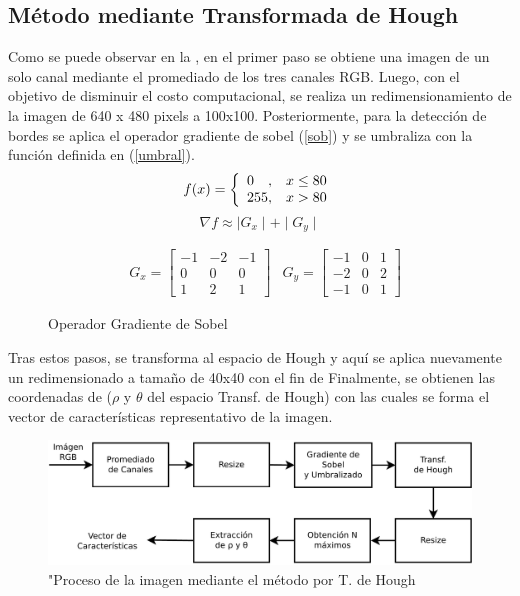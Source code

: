 \documentclass[conference,spanish,a4paper,10pt,oneside,final]{tfmpd}
\begin{document}
\subsection*{Método mediante Transformada de Hough}
Como se puede observar en la , en el primer paso se obtiene una imagen de un solo canal mediante el promediado de los tres canales RGB. Luego, con el objetivo de disminuir el costo computacional, se realiza un redimensionamiento de la imagen de 640 x 480 pixels a 100x100. Posteriormente, para la detección de bordes se aplica el operador gradiente de sobel (\ref{sob}) y se umbraliza con la función definida en (\ref{umbral}).
\begin{equation}\label{umbral}
f(x) = \left\{
\begin{array}{l@{,\quad}l}
0 & x \leq 80\\
255 & x>80
\end{array}
\right.
\end{equation}
%
\begin{equation}
\nabla f \approx \mid G_x \mid + \mid G_y \mid \label{sob}
\end{equation}
%
\begin{figure}
\begin{align*}
& G_x = \left[
\begin{array}{ccc}
-1 & -2 & -1\\
 0 & 0 & 0 \\
 1 & 2 & 1
\end{array}
\right]
&G_y = \left[
\begin{array}{ccc}
-1 & 0 & 1\\
 -2 & 0 & 2 \\
 -1 & 0 & 1
\end{array}
\right]
\end{align*}
\caption{Operador Gradiente de Sobel}
\end{figure}
Tras estos pasos, se transforma al espacio de Hough y aquí se aplica nuevamente un redimensionado a tamaño de 40x40 con el fin de 
Finalmente, se obtienen las coordenadas de  ($\rho$ y $\theta$ del espacio Transf. de Hough) con las cuales se forma el vector de características representativo de la imagen.
\begin{figure}
\includegraphics[scale=0.25]{../diagramas/procesohough} 
\caption{"Proceso de la imagen mediante el método por T. de Hough}
\end{figure}
\end{document}
